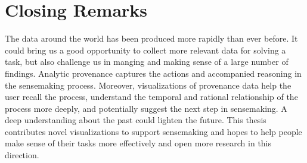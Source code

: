 \section{Closing Remarks}
The data around the world has been produced more rapidly than ever before. It could bring us a good opportunity to collect more relevant data for solving a task, but also challenge us in manging and making sense of a large number of findings. Analytic provenance captures the actions and accompanied reasoning in the sensemaking process. Moreover, visualizations of provenance data help the user recall the process, understand the temporal and rational relationship of the process more deeply, and potentially suggest the next step in sensemaking. A deep understanding about the past could lighten the future. This thesis contributes novel visualizations to support sensemaking and hopes to help people make sense of their tasks more effectively and open more research in this direction.